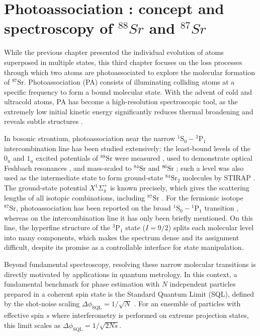 ﻿\chapter{Photoassociation : concept and spectroscopy of $^{88}Sr$ and $^{87}Sr$}
\label{chap 3}
\newcommand{\PATheoryFigDir}{Chapitres/Engineering highly entangled system of photoassociated 87Sr atoms/images/Figures_pour_theorie/}
\newcommand{\PATheoryFig}[1]{\PATheoryFigDir#1}

While the previous chapter presented the individual evolution of atoms superposed in multiple states, this third chapter focuses on the loss processes through which two atoms 
are photoassociated to explore the molecular formation of $^{87}\text{Sr}$.
Photoassociation (PA) consists of illuminating colliding atoms at a specific frequency to form a bound molecular state. With the advent of cold and ultracold atoms, PA has 
become a high-resolution spectroscopic tool, as the extremely low initial kinetic energy significantly reduces thermal broadening and reveals subtle structures 
\cite{jones_ultracold_2006}.

In bosonic strontium, photoassociation near the narrow $^1\text{S}_0-{}^3\text{P}_1$
intercombination line has been studied extensively: the least-bound levels of the $0_u$ and
$1_u$ excited potentials of $^{88}\text{Sr}$ were measured \cite{zelevinsky_narrow_2006}, used to
demonstrate optical Feshbach resonances \cite{blatt_measurement_2011, blatt_systematic_2011},
and mass-scaled to $^{84}\text{Sr}$ and $^{86}\text{Sr}$ \cite{borkowski_mass_2014,
reschovsky_narrow-line_2018}; such a level was also used as the intermediate state to form
ground-state $^{84}\text{Sr}_2$ molecules by STIRAP \cite{stellmer_creation_2012}. The
ground-state potential $X^1\Sigma_g^+$ is known precisely, which gives the scattering lengths
of all isotopic combinations, including $^{87}\text{Sr}$ \cite{stein_1s1s_2010}. For the
fermionic isotope $^{87}\text{Sr}$, photoassociation has been reported on the broad
$^1\text{S}_0-{}^1\text{P}_1$ transition \cite{hill_photoassociative_2021}, whereas on the
intercombination line it has only been briefly mentioned. On this line, the hyperfine
structure of the $^3\text{P}_1$ state ($I=9/2$) splits each molecular level into many
components, which makes the spectrum dense and its assignment difficult, despite its promise
as a controllable interface for state manipulation.

Beyond fundamental spectroscopy, resolving these narrow molecular transitions is directly motivated by applications in quantum metrology. In this context, a fundamental 
benchmark for phase estimation with $N$ independent particles prepared in a coherent spin state is the Standard Quantum Limit (SQL), defined by the shot-noise scaling $\Delta\phi_{\text{SQL}} = 
1/\sqrt{N}$ \cite{pezze_quantum_2014}. For an ensemble of particles with effective spin $s$ where interferometry is performed on extreme projection states, this limit scales as $\Delta\phi_{\text{SQL}} = 
1/\sqrt{2Ns}$.

